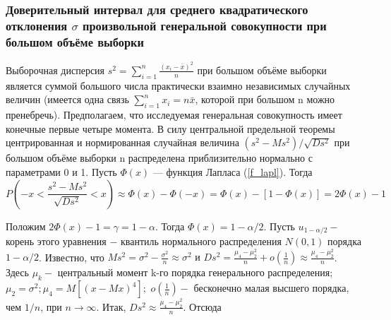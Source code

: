 \subsubsection{Доверительный интервал для среднего квадратического отклонения $\sigma$ произвольной генеральной совокупности при большом объёме выборки}
Выборочная дисперсия $s^{2} = \sum_{i = 1}^{n}{\frac{(x_{i} - \bar{x})^{2}}{n}}$ при большом объёме выборки является суммой большого числа практически взаимно независимых случайных величин (имеется одна связь $\sum_{i=1}^{n}{x_{i}} = n\bar{x}$, которой при большом n можно пренебречь). Предполагаем, что исследуемая генеральная совокупность имеет конечные первые четыре момента.
\newline
В силу центральной предельной теоремы центрированная и нормированная случайная величина $(s^{2}-Ms^{2})/\sqrt{Ds^{2}}$ при большом объёме выборки n распределена приблизительно нормально с параметрами 0 и 1. Пусть $\Phi(x)$ — функция Лапласа (\ref{f_lapl}). Тогда
\begin{equation}
P\left(-x < \frac{s^{2}-Ms^{2}}{\sqrt{Ds^{2}}} < x\right)
\approx \Phi(x) - \Phi(-x)=\Phi(x) - [1 - \Phi(x)] = 2\Phi(x) - 1
\label{P_as_sigma}
\end{equation}

Положим $2\Phi(x)-1 = \gamma = 1-\alpha$. Тогда $\Phi(x) = 1-\alpha/2$. Пусть $u_{1-\alpha/2} - $ корень этого уравнения $-$ квантиль нормального распределения $N(0,1)$ порядка $1-\alpha/2$. Известно, что $Ms^{2} = \sigma^{2} -\frac{\sigma^{2}}{n} \approx \sigma^{2} \text{ и } Ds^{2} = \frac{\mu_{4} -\mu_{2}^{2}}{n} + o(\frac{1}{n}) \approx \frac{\mu_{4} -\mu_{2}^{2}}{n}$. Здесь $\mu_{k} -$ центральный момент k-го порядка генерального распределения; $\mu_2 = \sigma^2; \mu_4 = M[(x-Mx)^4];$
$o(\frac{1}{n}) -$ бесконечно малая высшего порядка, чем $1/n$, при $n\rightarrow \infty$. Итак, $Ds^{2} \approx \frac{\mu_{4} -\mu_{2}^{2}}{n}$. Отсюда


